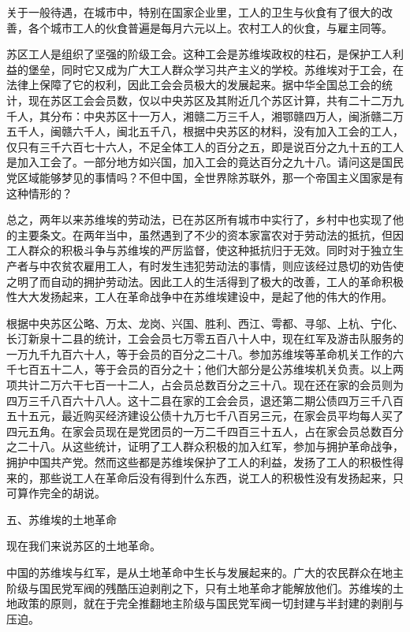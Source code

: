 关于一般待遇，在城市中，特别在国家企业里，工人的卫生与伙食有了很大的改善，各个城市工人的伙食普遍是每月六元以上。农村工人的伙食，与雇主同等。

苏区工人是组织了坚强的阶级工会。这种工会是苏维埃政权的柱石，是保护工人利益的堡垒，同时它又成为广大工人群众学习共产主义的学校。苏维埃对于工会，在法律上保障了它的权利，因此工会会员极大的发展起来。据中华全国总工会的统计，现在苏区工会会员数，仅以中央苏区及其附近几个苏区计算，共有二十二万九千人，其分布：中央苏区十一万人，湘赣二万三千人，湘鄂赣四万人，闽浙赣二万五千人，闽赣六千人，闽北五千八，根据中央苏区的材料，没有加入工会的工人，仅只有三千六百七十六人，不足全体工人的百分之五，即是说百分之九十五的工人是加入工会了。一部分地方如兴国，加入工会的竟达百分之九十八。请问这是国民党区域能够梦见的事情吗？不但中国，全世界除苏联外，那一个帝国主义国家是有这种情形的？

总之，两年以来苏维埃的劳动法，已在苏区所有城市中实行了，乡村中也实现了他的主要条文。在两年当中，虽然遇到了不少的资本家富农对于劳动法的抵抗，但因工人群众的积极斗争与苏维埃的严厉监督，使这种抵抗归于无效。同时对于独立生产者与中农贫农雇用工人，有时发生违犯劳动法的事情，则应该经过恳切的劝告使之明了而自动的拥护劳动法。因此工人的生活得到了极大的改善，工人的革命积极性大大发扬起来，工人在革命战争中在苏维埃建设中，是起了他的伟大的作用。

根据中央苏区公略、万太、龙岗、兴国、胜利、西江、雩都、寻邬、上杭、宁化、长汀新泉十二县的统计，工会会员七万零五百八十人中，现在红军及游击队服务的一万九千九百六十人，等于会员的百分之二十八。参加苏维埃等革命机关工作的六千七百五十二人，等于会员的百分之十；他们大部分是公苏维埃机关负责。以上两项共计二万六干七百一十二人，占会员总数百分之三十八。现在还在家的会员则为四万三千八百六十八人。这十二县在家的工会会员，退还第二期公债四万三千八百五十五元，最近购买经济建设公债十九万七千八百另三元，在家会员平均每人买了四元五角。在家会员现在是党团员的一万二千四百三十五人，占在家会员总数百分之二十八。从这些统计，证明了工人群众积极的加入红军，参加与拥护革命战争，拥护中国共产党。然而这些都是苏维埃保护了工人的利益，发扬了工人的积极性得来的，那些说工人在革命后没有得到什么东西，说工人的积极性没有发扬起来，只可算作完全的胡说。

五、苏维埃的土地革命

现在我们来说苏区的土地革命。

中国的苏维埃与红军，是从土地革命中生长与发展起来的。广大的农民群众在地主阶级与国民党军阀的残酷压迫剥削之下，只有土地革命才能解放他们。苏维埃的土地政策的原则，就在于完全推翻地主阶级与国民党军阀一切封建与半封建的剥削与压迫。

